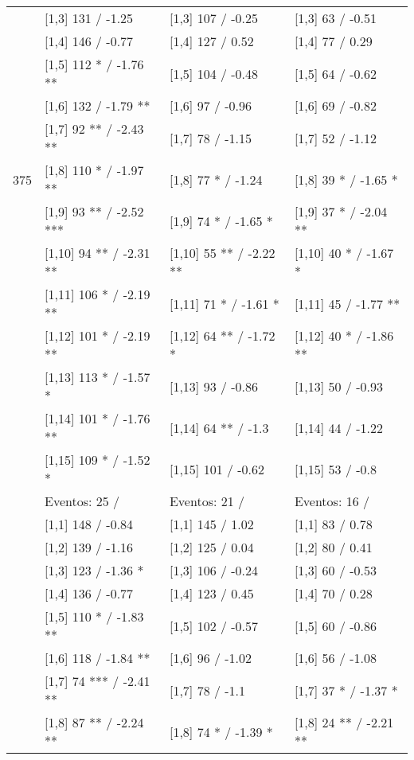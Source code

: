 \begin{table}
\begin{tabular}[t]{llll}
 & {}[1,3] 131  / -1.25 & {}[1,3] 107  / -0.25 & {}[1,3] 63  / -0.51\\
\addlinespace
 & {}[1,4] 146  / -0.77 & {}[1,4] 127  / 0.52 & {}[1,4] 77  / 0.29\\
 & {}[1,5] 112 * / -1.76 ** & {}[1,5] 104  / -0.48 & {}[1,5] 64  / -0.62\\
 & {}[1,6] 132  / -1.79 ** & {}[1,6] 97  / -0.96 & {}[1,6] 69  / -0.82\\
 & {}[1,7] 92 ** / -2.43 ** & {}[1,7] 78  / -1.15 & {}[1,7] 52  / -1.12\\
375 & {}[1,8] 110 * / -1.97 ** & {}[1,8] 77 * / -1.24 & {}[1,8] 39 * / -1.65 *\\
\addlinespace
 & {}[1,9] 93 ** / -2.52 *** & {}[1,9] 74 * / -1.65 * & {}[1,9] 37 * / -2.04 **\\
 & {}[1,10] 94 ** / -2.31 ** & {}[1,10] 55 ** / -2.22 ** & {}[1,10] 40 * / -1.67 *\\
 & {}[1,11] 106 * / -2.19 ** & {}[1,11] 71 * / -1.61 * & {}[1,11] 45  / -1.77 **\\
 & {}[1,12] 101 * / -2.19 ** & {}[1,12] 64 ** / -1.72 * & {}[1,12] 40 * / -1.86 **\\
 & {}[1,13] 113 * / -1.57 * & {}[1,13] 93  / -0.86 & {}[1,13] 50  / -0.93\\
\addlinespace
 & {}[1,14] 101 * / -1.76 ** & {}[1,14] 64 ** / -1.3 & {}[1,14] 44  / -1.22\\
 & {}[1,15] 109 * / -1.52 * & {}[1,15] 101  / -0.62 & {}[1,15] 53  / -0.8\\
 & Eventos:  25 / & Eventos:  21 / & Eventos:  16 /\\
 & {}[1,1] 148  / -0.84 & {}[1,1] 145  / 1.02 & {}[1,1] 83  / 0.78\\
 & {}[1,2] 139  / -1.16 & {}[1,2] 125  / 0.04 & {}[1,2] 80  / 0.41\\
\addlinespace
 & {}[1,3] 123  / -1.36 * & {}[1,3] 106  / -0.24 & {}[1,3] 60  / -0.53\\
 & {}[1,4] 136  / -0.77 & {}[1,4] 123  / 0.45 & {}[1,4] 70  / 0.28\\
 & {}[1,5] 110 * / -1.83 ** & {}[1,5] 102  / -0.57 & {}[1,5] 60  / -0.86\\
 & {}[1,6] 118  / -1.84 ** & {}[1,6] 96  / -1.02 & {}[1,6] 56  / -1.08\\
 & {}[1,7] 74 *** / -2.41 ** & {}[1,7] 78  / -1.1 & {}[1,7] 37 * / -1.37 *\\
\addlinespace
500 & {}[1,8] 87 ** / -2.24 ** & {}[1,8] 74 * / -1.39 * & {}[1,8] 24 ** / -2.21 **\\

\end{tabular}
\end{table}
